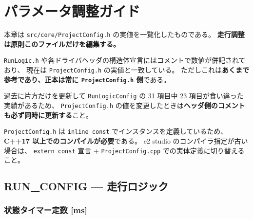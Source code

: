 \documentclass[a4paper,11pt,dvipdfmx]{jsarticle}
\begin{document}
\section{パラメータ調整ガイド}\label{sec:params}

本章は \texttt{src/core/ProjectConfig.h} の実値を一覧化したものである。
\textbf{走行調整は原則このファイルだけを編集する。}

\begin{cautionbox}
\texttt{RunLogic.h} や各ドライバヘッダの構造体宣言にはコメントで数値が併記されており、
現在は \texttt{ProjectConfig.h} の実値と一致している。
ただしこれは\textbf{あくまで参考であり、正本は常に \texttt{ProjectConfig.h} 側}である。

過去に片方だけを更新して \texttt{RunLogicConfig} の 31 項目中 23 項目が食い違った実績があるため、
\texttt{ProjectConfig.h} の値を変更したときは\textbf{ヘッダ側のコメントも必ず同時に更新する}こと。
\end{cautionbox}

\begin{notebox}
\texttt{ProjectConfig.h} は \texttt{inline const} でインスタンスを定義しているため、
\textbf{C++17 以上でのコンパイルが必要}である。
e2 studio のコンパイラ指定が古い場合は、
\texttt{extern const} 宣言 + \texttt{ProjectConfig.cpp} での実体定義に切り替えること。
\end{notebox}

\subsection{RUN\_CONFIG --- 走行ロジック}\label{sec:params-run}

\subsubsection{状態タイマー定数 [ms]}
\end{document}
